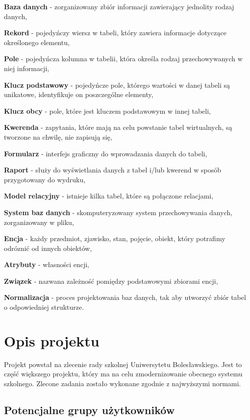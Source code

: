 \documentclass[12pt,a4paper]{article}
\begin{document}
\textbf{Baza danych} - zorganizowany zbiór informacji zawierający jednolity rodzaj danych,

\textbf{Rekord} - pojedyńczy wiersz w tabeli, który zawiera informacje dotyczące określonego elementu,

\textbf{Pole} - pojedyńcza kolumna w tabelii, która określa rodzaj przechowywanych w niej informacji,

\textbf{Klucz podstawowy} - pojedyńcze pole, którego wartości w danej tabeli są unikatowe, identyfikuje on poszczególne elementy,

\textbf{Klucz obcy} - pole, które jest kluczem podstawowym w innej tabeli,

\textbf{Kwerenda} - zapytania, które mają na celu powstanie tabel wirtualnych, są tworzone na chwilę, nie zapisują się,

\textbf{Formularz} - interfejs graficzny do wprowadzania danych do tabeli,

\textbf{Raport} - służy do wyświetlania danych z tabel i/lub kwerend w sposób przygotowany do wydruku,

\textbf{Model relacyjny} - istnieje kilka tabel, które są połączone relacjami,

\textbf{System baz danych} - skomputeryzowany system przechowywania danych, zorganizowany w pliku,

\textbf{Encja} - każdy przedmiot, zjawisko, stan, pojęcie, obiekt, który potrafimy odróznić od innych obiektów,

\textbf{Atrybuty} - własności encji,

\textbf{Związek} - nazwana zależność pomiędzy podstawowymi zbiorami encji,

\textbf{Normalizacja} - proces projektowania baz danych, tak aby utworzyć zbiór tabel o odpowiedniej strukturze.

\section{Opis projektu}
\label{sec:Project}

Projekt powstał na zlecenie rady szkolnej Uniwersytetu Bolesławskiego. Jest to część większego projektu, który ma na celu zmodernizowanie obecnego systemu szkolnego. Zlecone zadania zostało wykonane zgodnie z najwyższymi normami. 


\subsection{Potencjalne grupy użytkowników}
\label{sec:Users}
\end{document}
